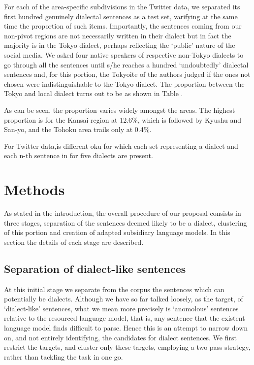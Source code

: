\documentclass{article}
\begin{document}
For each of the area-specific subdivisions in the Twitter data, we separated its first hundred genuinely dialectal sentences as a test set, varifying at the same time the proportion of such items. Importantly, the sentences coming from our non-pivot regions are not necessarily written in their dialect but in fact the majority is in the Tokyo dialect, perhaps reflecting the `public' nature of the social media. We asked four native speakers of respective non-Tokyo dialects to go through all the sentences until s/he reaches a hundred `undoubtedly' dialectal sentences and, for this portion, the Tokyoite of the authors judged if the ones not chosen were indistinguishable to the Tokyo dialect. The proportion between the Tokyo and local dialect turns out to be as shown in Table \label{}.

As can be seen, the proportion varies widely amongst the areas. The highest proportion is for the Kansai region at 12.6\%, which is followed by Kyushu and San-yo, and the Tohoku area trails only at 0.4\%.  


For Twitter data,is different   oku  for which each set representing a dialect and each n-th sentence in  for five dialects are present. 



\section{Methods}

As stated in the introduction, the overall procedure of our proposal consists in three stages, separation of the sentences deemed likely to be a dialect, clustering of this portion and creation of adapted subsidiary language models. In this section the details of each stage are described.



\subsection{Separation of dialect-like sentences}

At this initial stage we separate from the corpus the sentences which can potentially be dialects. Although we have so far talked loosely, as the target, of `dialect-like' sentences, what we mean more precisely is `anomolous' sentences relative to the resourced language model, that is, any sentence that the existent language model finds difficult to parse. Hence this is an attempt to narrow down on, and not entirely identifying, the candidates for dialect sentences. We first restrict the targets, and cluster only these targets, employing a two-pass strategy, rather than tackling the task in one go.
\end{document}
